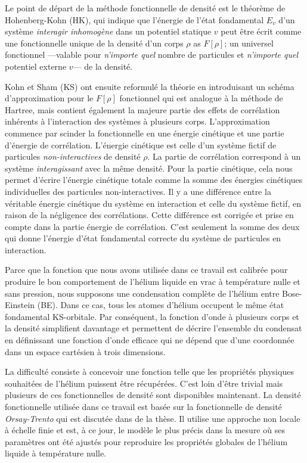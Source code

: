 		Le point de départ de la méthode fonctionnelle de densité est le théorème de Hohenberg-Kohn\citep{Hohenberg1964} (HK), qui indique que l'énergie de l'état fondamental $E_v$ d'un système \emph{interagir inhomogène} dans un potentiel statique $v$ peut être écrit comme une fonctionnelle unique de la densité d'un corps $\rho$ as $F[\rho]$; un universel fonctionnel ---valable pour \emph{n'importe quel} nombre de particules et \emph{n'importe quel} potentiel externe $v$--- de la densité.
		
		Kohn et Sham (KS) ont ensuite reformulé\citep{Kohn1965} la théorie en introduisant un schéma d'approximation pour le $F[\rho]$ fonctionnel qui est analogue à la méthode de Hartree, mais contient également la majeure partie des effets de corrélation inhérents à l'interaction des systèmes à plusieurs corps. L'approximation commence par scinder la fonctionnelle en une énergie cinétique et une partie d'énergie de corrélation. L'énergie cinétique est celle d'un système fictif de particules \emph{non-interactives} de densité $\rho$. La partie de corrélation correspond à un système \emph{interagissant} avec la même densité. Pour la partie cinétique, cela nous permet d'écrire l'énergie cinétique totale comme la somme des énergies cinétiques individuelles des particules non-interactives. Il y a une différence entre la véritable énergie cinétique du système en interaction et celle du système fictif, en raison de la négligence des corrélations. Cette différence est corrigée et prise en compte dans la partie énergie de corrélation. C'est seulement la somme des deux qui donne l'énergie d'état fondamental correcte du système de particules en interaction.
		
		Parce que la fonction que nous avons utilisée dans ce travail est calibrée pour produire le bon comportement de l'hélium liquide en vrac à température nulle et sans pression, nous supposons une condensation complète de l'hélium entre Bose-Einstein (BE). Dans ce cas, tous les atomes d'hélium occupent le même état fondamental KS-orbitale. Par conséquent, la fonction d'onde à plusieurs corps et la densité simplifient davantage et permettent de décrire l'ensemble du condensat en définissant une fonction d'onde efficace qui ne dépend que d'une coordonnée dans un espace cartésien à trois dimensions.
		
		La difficulté consiste à concevoir une fonction telle que les propriétés physiques souhaitées de l'hélium puissent être récupérées. C'est loin d'être trivial mais plusieurs de ces fonctionnelles de densité sont disponibles maintenant. La densité fonctionnelle utilisée dans ce travail est basée sur la fonctionnelle de densité \emph{Orsay-Trento} qui est discutée dans  de la thèse. Il utilise une approche non locale à échelle finie et est, à ce jour, le modèle le plus précis dans la mesure où ses paramètres ont été ajustés pour reproduire les propriétés globales de l'hélium liquide à température nulle.
		
